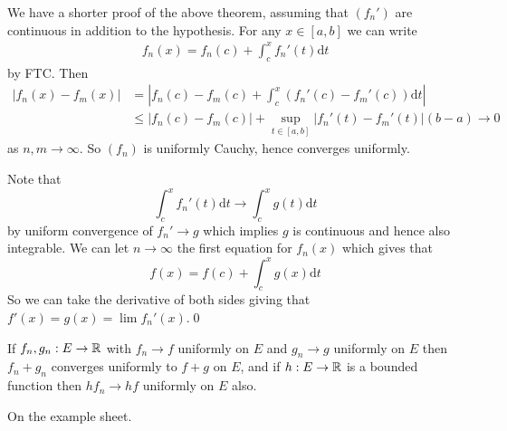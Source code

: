 \documentclass{article}
\begin{document}
We have a shorter proof of the above theorem, assuming that $ (f_n') $ are continuous in addition to the hypothesis. For any $ x\in [a,b] $ we can write
\begin{align*}
  f_n(x)=f_n(c)+\int_c^xf_n'(t)\mathrm dt
\end{align*}
by FTC. Then
\begin{align*}
	|f_n(x)-f_m(x)|&=\left|f_n(c)-f_m(c)+\int_c^x(f_n'(c)-f_m'(c))\mathrm dt\right|\\
		       &\le |f_n(c)-f_m(c)|+\sup_{t\in[a,b]}|f_n'(t)-f_m'(t)|(b-a)\to 0
\end{align*} as $ n,m\to\infty $. So $ (f_n) $ is uniformly Cauchy, hence converges uniformly.\par
Note that 
\[
	\int_c^xf_n'(t)\mathrm dt\to \int_c^xg(t)\mathrm dt
\]
by uniform convergence of $ f_n'\to g $ which implies $ g $ is continuous and hence also integrable. We can let $ n\to\infty $ the first equation for $ f_n(x) $ which gives that
\[
  f(x)=f(c)+\int_c^xg(x)\mathrm dt
\]
So we can take the derivative of both sides giving that $ f'(x)=g(x)=\lim f_n'(x) $.\qed
\begin{proposition}
  If $ f_n,g_n:E\to \mathbb{R} $ with $ f_n\to f $ uniformly on $ E $ and $ g_n\to g $ uniformly on $ E $ then $ f_n+g_n $ converges uniformly to $ f+g $ on $ E $, and if $ h:E\to \mathbb{R} $ is a bounded function then $ hf_n\to hf $ uniformly on $ E $ also.
\end{proposition}
\pf On the example sheet.
\end{document}

